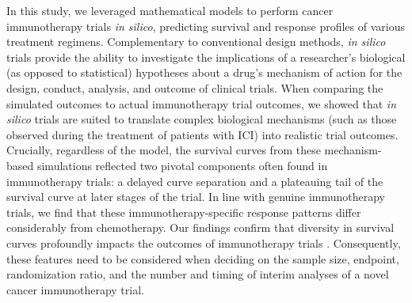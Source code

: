 \documentclass[a4paper,10pt]{article}
\begin{document}
In this study, we leveraged mathematical models to perform cancer immunotherapy trials
\emph{in silico}, predicting survival and response profiles of various treatment regimens.
Complementary to conventional design methods, \emph{in silico} trials provide the
ability to investigate the implications of a researcher's biological (as
opposed to statistical) hypotheses about a drug's mechanism of action for the
design, conduct, analysis, and outcome of clinical trials. When comparing the
simulated outcomes to actual immunotherapy trial outcomes, we showed that 
\emph{in silico} trials are suited to translate complex biological mechanisms (such as those
observed during the treatment of patients with ICI) into realistic trial
outcomes. Crucially, regardless of the model, 
the survival curves from these
mechanism-based simulations reflected two pivotal components often found in
immunotherapy trials: a delayed curve separation and a plateauing tail of the
survival curve at later stages of the trial. In line with genuine immunotherapy
trials, we find that these immunotherapy-specific response patterns differ
considerably from chemotherapy. Our findings confirm that
diversity in survival curves profoundly impacts the outcomes of immunotherapy
trials \cite{Chen2016}. Consequently, these features need to be considered when
deciding on the sample size, endpoint, randomization ratio, and the number and
timing of interim analyses of a novel cancer immunotherapy trial.
\end{document}
